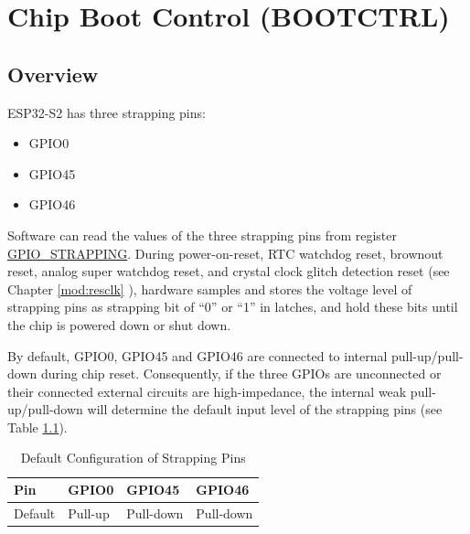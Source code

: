 \documentclass[main\_\_EN.tex]{subfiles}
\begin{document}
\setenglishformatting

\ifglobal
\else
    \listoftodos
    {\let\clearpage\relax \listofdonetodos}
    \tableofcontents
\fi




\hypertarget{bootctrl}{}
\chapter{Chip Boot Control (BOOTCTRL)}
\label{mod:bootctrl}

\section{Overview}

ESP32-S2 has three strapping pins:
\begin{itemize}
    \item GPIO0
    \item GPIO45
    \item GPIO46
\end{itemize}

Software can read the values of the three strapping pins from register \hyperref[fielddesc:GPIOSTRAPPING]{GPIO\_STRAPPING}.
During power-on-reset, RTC watchdog reset, brownout reset, analog super watchdog reset, and crystal clock glitch detection reset (see Chapter \ref{mod:resclk} \textit{}), hardware samples and stores the voltage level of strapping pins as strapping bit of “0” or “1” in latches, and hold these bits until the chip is powered down or shut down.

By default, GPIO0, GPIO45 and GPIO46 are connected to internal pull-up/pull-down during chip reset. Consequently, if the three GPIOs are unconnected or their connected external circuits are high-impedance, the internal weak pull-up/pull-down will determine the default input level of the strapping pins (see Table \ref{table:pull_up_down}).

\begin{longtable}[c]{|p{2.5cm}|p{2.5cm}|p{2.5cm}|p{2.5cm}|}
\caption{Default Configuration of Strapping Pins}
\label{table:pull_up_down}
    \\\hline
    \rowcolor{lightgray}
  Pin & GPIO0 & GPIO45 & GPIO46 \\ \hline
  Default & Pull-up & Pull-down & Pull-down \\ \hline
\end{longtable}
\end{document}
